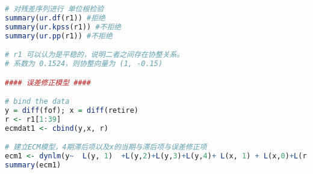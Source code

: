 \begin{lstlisting}[language=R,frame=single]
# 对残差序列进行 单位根检验
summary(ur.df(r1)) #拒绝
summary(ur.kpss(r1)) #不拒绝
summary(ur.pp(r1)) #不拒绝

# r1 可以认为是平稳的，说明二者之间存在协整关系。
# 系数为 0.1524，则协整向量为 (1, -0.15)

#### 误差修正模型 ####

# bind the data
y = diff(fof); x = diff(retire)
r <- r1[1:39]
ecmdat1 <- cbind(y,x, r)

# 建立ECM模型，4期滞后项以及x的当期与滞后项与误差修正项
ecm1 <- dynlm(y~  L(y, 1)  +L(y,2)+L(y,3)+L(y,4)+ L(x, 1) + L(x,0)+L(r, 1), data = ecmdat1)
summary(ecm1)

\end{lstlisting}

